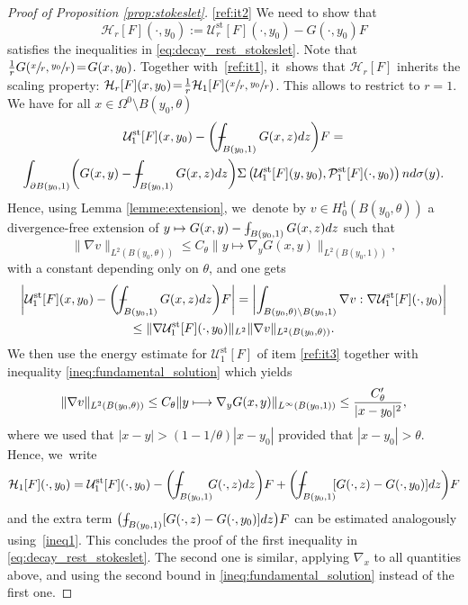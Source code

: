 \documentclass[10pt]{amsart}
\newcommand\mto{\mathchoice{\longmapsto}{\mapsto}{\mapsto}{\mapsto}}
\newcommand{\st}{\mathrm{st}}
\def\Xint#1{\mathchoice
{\XXint\displaystyle\textstyle{#1}}%
{\XXint\textstyle\scriptstyle{#1}}%
{\XXint\scriptstyle\scriptscriptstyle{#1}}%
{\XXint\scriptscriptstyle\scriptscriptstyle{#1}}%
\!\int}
\def\XXint#1#2#3{{\setbox0=\hbox{$#1{#2#3}{\int}$ }
\vcenter{\hbox{$#2#3$ }}\kern-.6\wd0}}
\def\dashint{\Xint-}
\theoremstyle{plain}
\theoremstyle{definition}
\let\na\nabla
\begin{document}
\begin{proof}[Proof of Proposition \ref{prop:stokeslet}]
\eqref{ref:it2} We need to show that\vspace*{-3pt}
\[
\mathcal{H}_r[F](\cdot,y_0) :=\mathcal{U}^{\st}_{r}[F](\cdot,y_0) - G(\cdot,y_0) F
\]
satisfies the inequalities in \eqref{eq:decay_rest_stokeslet}. Note that $\frac{1}{r}G(\sfrac{x}{r},\sfrac{y_0}{r})\!=\!G(x,y_0)$. Together with~\eqref{ref:it1}, it~shows that $\mathcal{H}_r[F]$ inherits the scaling property:
$\mathcal{H}_{r}[F](x,y_0)\!=\! \frac{1}{r} \mathcal{H}_{1}[F](\sfrac{x}{r},\sfrac{y_0}{r})$.
This allows to restrict to $r=1$. We have for all $x \in \Omega^0 \setminus B(y_0,\theta)$\vspace*{-5pt}
\begin{multline*}
\mathcal{U}^{\st}_{1}[F](x,y_0) - \biggl(\dashint_{ B(y_0,1)} G(x,z) d z \biggr) F = \\
\int_{\partial B(y_0,1)} \biggl(G(x,y)-\dashint_{ B(y_0,1)} G(x,z) d z \biggr)\Sigma\left(\mathcal{U}^{\st}_{1}[F](y,y_0),\mathcal{P}^{\st}_1[F](\cdot,y_0)\right) n d \sigma (y).
\end{multline*}
Hence, using Lemma \ref{lemme:extension}, we~denote by $v\in H^1_0(B(y_0,\theta))$ a divergence-free extension of $y \mto G(x,y)-\dashint_{ B(y_0,1)} G(x,z) d z$ such that
\[
\| \nabla v \|_{L^2(B(y_0,\theta))} \leq C_\theta \|y\mapsto \nabla_y G(x,y) \|_{L^2(B(y_0,1))},
\]
with a constant depending only on $\theta$, and one gets\vspace*{-3pt}
\begin{multline*}
\biggl |\mathcal{U}^{\st}_{1}[F](x,y_0)- \biggl(\dashint_{ B(y_0,1)} G(x,z) d z \biggr) F \biggr|= \biggl |\int_{B(y_0,\theta)\setminus B(y_0,1)} \nabla v : \nabla \mathcal{U}^{\st}_{1}[F](\cdot,y_0) \biggr|\\
\leq \| \nabla \mathcal{U}^{\st}_{1}[F](\cdot,y_0)\|_{L^2} \| \nabla v \|_{L^2(B(y_0,\theta))}.
\end{multline*}
We then use the energy estimate for $ \mathcal{U}^{\st}_{1}[F]$ of item \eqref{ref:it3}
together with inequality \eqref{ineq:fundamental_solution} which yields\vspace*{-3pt}
\begin{equation}\label{ineq1}
\| \nabla v \|_{L^2(B(y_0,\theta))} \le C_\theta \|y\mto \nabla_y G(x,y)\|_{L^\infty(B(y_0,1))} \leq \frac{C'_\theta}{|x-y_0|^2},
\end{equation}
where we used that $|x-y|>(1-1/\theta)|x-y_0|$ provided that $|x-y_0|>\theta$. Hence, we~write\vspace*{-3pt}
\[
\mathcal{H}_1[F](\cdot,y_0) = \mathcal{U}^{\st}_{1}[F](\cdot,y_0) - \biggl(\dashint_{ B(y_0,1)}\hspace*{-2mm} G(\cdot,z) dz \biggr) F
+ \biggl(\dashint_{ B(y_0,1)}\hspace*{-1mm} [G(\cdot,z) - G(\cdot,y_0)] dz \biggr) F
\]
and the extra term $\bigl(\dashint_{ B(y_0,1)} [G(\cdot,z) - G(\cdot,y_0)] dz \bigr) F$ can be estimated analogously using~\eqref{ineq1}. This concludes the proof of the first inequality in \eqref{eq:decay_rest_stokeslet}. The second one is similar, applying $\na_x$ to all quantities above, and using the second bound in \eqref{ineq:fundamental_solution} instead of the first one.
\end{proof}
\end{document}
